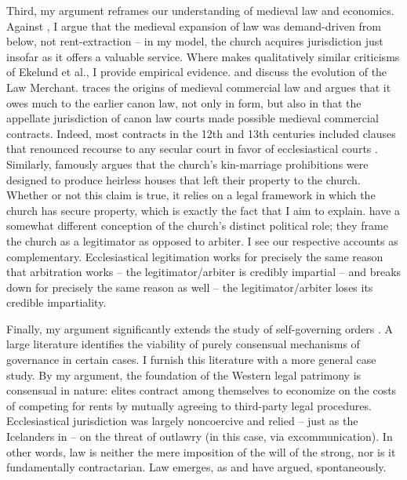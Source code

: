 \documentclass[12pt]{article}
\theoremstyle{definition}
\theoremstyle{remark}
\begin{document}
Third, my argument reframes our understanding of medieval law and economics. Against \cite{ekelund_1996}, I argue that the medieval expansion of law was demand-driven from below, not rent-extraction -- in my model, the church acquires jurisdiction just insofar as it offers a valuable service. Where \cite{davray_2024} makes qualitatively similar criticisms of Ekelund et al., I provide empirical evidence. \citet{benson_1990} and \citet{milgrom_north_weingast_1990} discuss the evolution of the Law Merchant. \citet{berman_1983} traces the origins of medieval commercial law and argues that it owes much to the earlier canon law, not only in form, but also in that the appellate jurisdiction of canon law courts made possible medieval commercial contracts. Indeed, most  contracts in the 12th and 13th centuries included clauses that renounced recourse to any secular court in favor of ecclesiastical courts \citep[223]{berman_1983}. Similarly, \citet{goody_1983} famously argues that the church's kin-marriage prohibitions were designed to produce heirless houses that left their property to the church. Whether or not this claim is true, it relies on a legal framework in which the church has secure property, which is exactly the fact that I aim to explain. \citet{greif_rubin_2024} have a somewhat different conception of the church's distinct political role; they frame the church as a legitimator as opposed to arbiter. I see our respective accounts as complementary. Ecclesiastical legitimation works for precisely the same reason that arbitration works -- the legitimator/arbiter is credibly impartial -- and breaks down for precisely the same reason as well -- the legitimator/arbiter loses its credible impartiality.

Finally, my argument significantly extends the study of self-governing orders \citep{greif_1989, greif_1993, greif_milgrom_weingast_1994, boettke_2005a, boettke_2005b, greif_2006, boettke_candela_2019, boettke_candela_2020}. A large literature \citep{friedman_1979, ostrom_1990, ellickson_1991, bernstein_1992, leeson_2007a, leeson_2007b, leeson_2007c, stringham_2015, geloso_leeson_2020} identifies the viability of purely consensual mechanisms of governance in certain cases. I furnish this literature with a more general case study. By my argument, the foundation of the Western legal patrimony is consensual in nature: elites contract among themselves to economize on the costs of competing for rents by mutually agreeing to third-party legal procedures. Ecclesiastical jurisdiction was largely noncoercive and relied -- just as the Icelanders in \citet{friedman_1979} -- on the threat of outlawry (in this case, via excommunication). In other words, law is neither the mere imposition of the will of the strong, nor is it fundamentally contractarian. Law emerges, as \citet{hume_1739} and \citet{hayek_1973} have argued, spontaneously.
\end{document}
